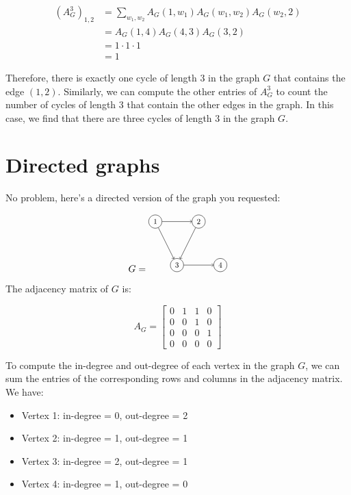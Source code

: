 \begin{align*}
(A_G^3)_{1,2} &= \sum_{w_1, w_2} A_G(1,w_1) A_G(w_1,w_2) A_G(w_2,2) \\
&= A_G(1,4) A_G(4,3) A_G(3,2) \\
&= 1 \cdot 1 \cdot 1 \\
&= 1
\end{align*}

Therefore, there is exactly one cycle of length 3 in the graph $G$ that contains the edge $(1,2)$. Similarly, we can compute the other entries of $A_G^3$ to count the number of cycles of length 3 that contain the other edges in the graph. In this case, we find that there are three cycles of length 3 in the graph $G$.

\section{Directed graphs}

No problem, here's a directed version of the graph you requested:

\[
G = \begin{tikzpicture}[->, scale=0.8, transform shape]
\node[shape=circle,draw=black] (1) at (0,2) {1};
\node[shape=circle,draw=black] (2) at (2,2) {2};
\node[shape=circle,draw=black] (3) at (1,0) {3};
\node[shape=circle,draw=black] (4) at (3,0) {4};
\draw[->] (1) -- (2);
\draw[->] (1) -- (3);
\draw[->] (2) -- (3);
\draw[->] (3) -- (4);
\end{tikzpicture}
\]

The adjacency matrix of $G$ is:

\[
A_G = \begin{bmatrix}
0 & 1 & 1 & 0 \\
0 & 0 & 1 & 0 \\
0 & 0 & 0 & 1 \\
0 & 0 & 0 & 0
\end{bmatrix}
\]

To compute the in-degree and out-degree of each vertex in the graph $G$, we can sum the entries of the corresponding rows and columns in the adjacency matrix. We have:

\begin{itemize}
  \item Vertex 1: in-degree = 0, out-degree = 2
  \item Vertex 2: in-degree = 1, out-degree = 1
  \item Vertex 3: in-degree = 2, out-degree = 1
  \item Vertex 4: in-degree = 1, out-degree = 0
\end{itemize}

